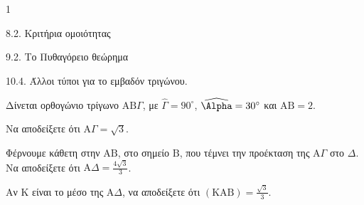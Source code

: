 \begin{ylh}{1}
    \item 8.2. Κριτήρια ομοιότητας
    \item 9.2. Το Πυθαγόρειο θεώρημα
    \item 10.4. Άλλοι τύποι για το εμβαδόν τριγώνου.
\end{ylh}
\begin{figure}
\end{figure}
Δίνεται ορθογώνιο τρίγωνο $\text{AB}\Gamma$, με $\widehat{\Gamma} = 90^\circ$, $\widehat{\Alpha} = 30^\circ$ και $\text{AB} = 2$.
\begin{alist}
    \item Να αποδείξετε ότι $\text{A}\Gamma = \sqrt{3}$. 
    \item Φέρνουμε κάθετη στην $\text{AB}$, στο σημείο $\text{B}$, που τέμνει την προέκταση της $\text{A}\Gamma$ στο $\Delta$. Να αποδείξετε ότι $\text{A}\Delta = \frac{4\sqrt{3}}{3}$. 
    \item Αν $\text{K}$ είναι το μέσο της $\text{A}\Delta$, να αποδείξετε ότι $(\text{KAB}) = \frac{\sqrt{3}}{3}$. 
\end{alist}